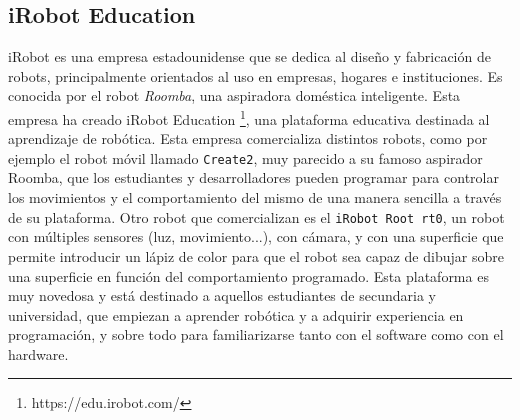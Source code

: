 \documentclass{report}
\begin{document}
\newpage
\subsection{iRobot Education}

iRobot \cite{iRobot} es una empresa estadounidense que se dedica al diseño y fabricación de robots, principalmente orientados al uso en empresas, hogares e instituciones. Es conocida por el robot \textit{Roomba}, una aspiradora doméstica inteligente. Esta empresa ha creado iRobot Education \footnote{https://edu.irobot.com/}, una plataforma educativa destinada al aprendizaje de robótica. Esta empresa comercializa distintos robots, como por ejemplo el  robot móvil llamado \texttt{Create2}, muy parecido a su famoso aspirador Roomba, que los estudiantes y desarrolladores pueden programar para controlar los movimientos y el comportamiento del mismo de una manera sencilla a través de su plataforma. Otro robot que comercializan es el \texttt{iRobot Root rt0}, un robot con múltiples sensores (luz, movimiento...), con cámara, y con una superficie que permite introducir un lápiz de color para que el robot sea capaz de dibujar sobre una superficie en función del comportamiento programado. Esta plataforma es muy novedosa y  está destinado a aquellos estudiantes de secundaria y universidad, que empiezan a aprender robótica y a adquirir experiencia en programación, y sobre todo para familiarizarse tanto con el software como con el hardware.
\end{document}
